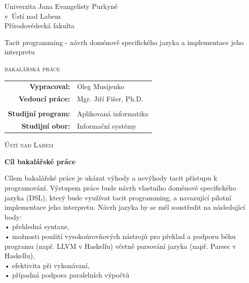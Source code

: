 \documentclass[male,czech]{kithesis}
\newcommand{\AUTOR}{Oleg Musijenko}
\newcommand{\TITULcz}{Tacit programming - návrh doménově specifického jazyka a implementace jeho interpretu} %
\newcommand{\VEDOUCI}{Mgr. Jiří Fišer, Ph.D.}
\newcommand{\PROGRAM}{Aplikovaná informatika}
\newcommand{\OBOR}{Informační systémy}
\begin{document}
\thispagestyle{empty}
\begin{center}
{\Huge Univerzita Jana Evangelisty Purkyně \\
v~Ústí nad Labem}
\\[16pt]
{\huge Přírodovědecká fakulta}

\vspace{2cm}

\vspace{2cm}
{
\huge
\TITULcz\par

\vspace{0.5em}
\LARGE\scshape bakalářská práce
}
\end{center} 
 
\vfill
{
\large
\begin{tabular}{>{\bfseries}rl}
    Vypracoval: 	& \AUTOR\\
    Vedoucí práce: 	& \VEDOUCI\\
&\\
Studijní program:       & \PROGRAM\\
Studijní obor:          & \OBOR\\
\end{tabular} 
}
\vspace{1.5cm}
\begin{center}
\Large\scshape   Ústí nad Labem \the\year
\end{center}

\cleardoublepage
\thispagestyle{empty}

\textbf{\textsf{Cíl bakalářské práce}}

Cílem bakalářské práce je ukázat výhody a nevýhody tacit přístupu k programování. Výstupem práce bude návrh vlastního doménově specifického jazyka (DSL), který
bude využívat tacit programming, a navazující pilotní implementace jeho interpretu.
Návrh jazyka by se měl soustředit na následující body:\\
• přehledná syntaxe,\\
• možnosti použití vysokoúrovňových nástrojů pro překlad a podporu běhu programu (např. LLVM v Haskellu) včetně parsování jazyka (např. Parsec v Haskellu),\\
• efektivita při vykonávaní,\\
• případná podpora paralelních výpočtů
\end{document}

